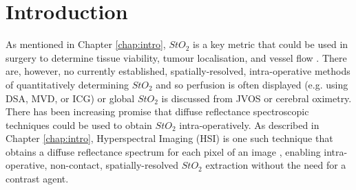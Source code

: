 \section{Introduction}\label{sec:intro}
As mentioned in Chapter \ref{chap:intro}, $StO_2$ is a key metric that could be used in surgery to determine tissue viability, tumour localisation, and vessel flow \cite{Takami2017, Hughes2019, Richardson2023}.
There are, however, no currently established, spatially-resolved, intra-operative methods of quantitatively determining $StO_2$ and so perfusion is often displayed (e.g. using DSA, MVD, or ICG) or global $StO_2$ is discussed from JVOS or cerebral oximetry.
There has been increasing promise that diffuse reflectance spectroscopic techniques could be used to obtain $StO_2$ intra-operatively. As described in Chapter \ref{chap:intro}, Hyperspectral Imaging (HSI) is one such technique that obtains a diffuse reflectance spectrum for each pixel of an image \cite{Kulcke2018, Taylor-Williams2022}, enabling intra-operative, non-contact, spatially-resolved $StO_2$ extraction without the need for a contrast agent. 

